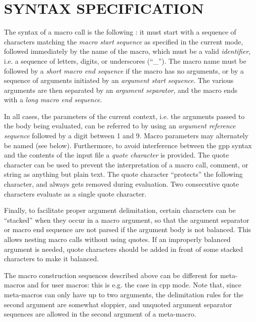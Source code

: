\htmlHR

\section{SYNTAX SPECIFICATION}

The syntax of a macro call is the following : it must start with a sequence of
characters matching the {\it macro start sequence} as specified in the current
mode, followed immediately by the name of the macro, which must be a valid
{\it identifier}, i.e. a sequence of letters, digits, or underscores (``\_'').
The macro name must be followed by a {\it short macro end sequence} if the
macro has no arguments, or by a sequence of arguments initiated by an {\it
argument start sequence}. The various arguments are then separated by an {\it
argument separator}, and the macro ends with a {\it long macro end sequence}. 

In all cases, the parameters of the current context, i.e. the arguments passed
to the body being evaluated, can be referred to by using an {\it argument
reference sequence} followed by a digit between 1 and 9. Macro parameters may
alternately be named (see below). Furthermore, to avoid interference between
the gpp syntax and the contents of the input file a {\it quote character} is
provided. The quote character can be used to prevent the interpretation of a
macro call, comment, or string as anything but plain text. The quote character
``protects'' the following character, and always gets removed during
evaluation. Two consecutive quote characters evaluate as a single quote
character. 

Finally, to facilitate proper argument delimitation, certain characters can be
``stacked'' when they occur in a macro argument, so that the argument
separator or macro end sequence are not parsed if the argument body is not
balanced. This allows nesting macro calls without using quotes. If an
improperly balanced argument is needed, quote characters should be added in
front of some stacked characters to make it balanced. 

The macro construction sequences described above can be different for
meta-macros and for user macros: this is e.g. the case in cpp mode. Note that,
since meta-macros can only have up to two arguments, the delimitation rules
for the second argument are somewhat sloppier, and unquoted argument separator
sequences are allowed in the second argument of a meta-macro. 

